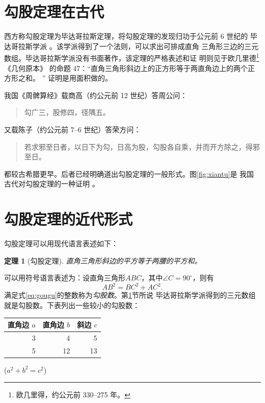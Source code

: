 \documentclass[UTF8]{ctexart}
\newenvironment{myquote}
{\begin{quote}\kaishu\zihao{-5}}
{\end{quote}}
\newcommand\degree{^\circ}
\newtheorem{thm}{定理}
\begin{document}
    \tableofcontents
    \section{勾股定理在古代}\label{sec:diyijie}
    西方称勾股定理为毕达哥拉斯定理，将勾股定理的发现归功于公元前 6 世纪的
    毕达哥拉斯学派 \cite{Kline}。该学派得到了一个法则，可以求出可排成直角
    三角形三边的三元数组。毕达哥拉斯学派没有书面著作，该定理的严格表述和证
    明则见于欧几里德\footnote{欧几里得，约公元前 330--275 年。}《几何原本》
    的命题 47：“直角三角形斜边上的正方形等于两直角边上的两个正方形之和。 ” 
    证明是用面积做的。
    
    我国《周髀算经》载商高（约公元前 12 世纪）答周公问：
    \begin{myquote}
        勾广三，股修四，径隅五。
    \end{myquote}
    又载陈子（约公元前 7--6 世纪）答荣方问：
    \begin{myquote}
        若求邪至日者，以日下为勾，日高为股，勾股各自乘，并而开方除之，得邪至日。
    \end{myquote}
    都较古希腊更早。后者已经明确道出勾股定理的一般形式。图\ref{fig:xiantu}是
    我国古代对勾股定理的一种证明 \cite{quanjing}。
   
    \section{勾股定理的近代形式}
    勾股定理可以用现代语言表述如下：
    \begin{thm}[勾股定理]
        直角三角形斜边的平方等于两腰的平方和。
    \end{thm}

    可以用符号语言表述为：设直角三角形$ABC$，其中$\angle C = 90\degree$，则有
    \begin{equation}\label{eq:gougu}
    AB^2 = BC^2 + AC^2.
    \end{equation}
    满足式\eqref{eq:gougu}的整数称为\emph{勾股数}。第\ref{sec:diyijie}节所说
    毕达哥拉斯学派得到的三元数组就是勾股数。下表列出一些较小的勾股数：
    \begin{table}[H]
        \begin{tabular}{|rrr|}
            \hline
            直角边 $a$ & 直角边 $b$ & 斜边 $c$ \\
            \hline
            3 & 4 & 5 \\
            5 & 12 & 13 \\
            \hline
        \end{tabular}%
        \qquad
        ($a^2 + b^2 = c^2$)
    \end{table}
    \nocite{Shiye}
    
\end{document}
